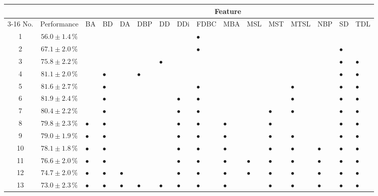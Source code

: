 \documentclass[11pt]{article}
\newcommand{\Sumbul}{S\"{u}mb\"{u}l\xspace}
\begin{document}
\begin{sidewaystable}
\begin{tabular}{ccllllllllllllll}
\toprule
 & & \multicolumn{14}{c}{Feature}\\
\cline{3-16}
No. & Performance  & BA & BD & DA & DBP & DD & DDi & FDBC & MBA & MSL & MST & MTSL & NBP & SD & TDL\\
\midrule
1 & $56.0 \pm 1.4\,\%$  &  &  &  &  &  &  & $\bullet$ &  &  &  &  &  &  & \\
2 & $67.1 \pm 2.0\,\%$  &  &  &  &  &  &  & $\bullet$ &  &  &  &  &  & $\bullet$ & \\
3 & $75.8 \pm 2.2\,\%$  &  &  &  &  & $\bullet$ &  &  &  &  &  &  &  & $\bullet$ & $\bullet$\\
4 & $81.1 \pm 2.0\,\%$  &  & $\bullet$ &  & $\bullet$ &  &  &  &  &  &  &  &  & $\bullet$ & $\bullet$\\
5 & $81.6 \pm 2.7\,\%$  &  & $\bullet$ &  &  &  &  & $\bullet$ &  &  &  & $\bullet$ &  & $\bullet$ & $\bullet$\\
6 & $81.9 \pm 2.4\,\%$  &  & $\bullet$ &  &  &  & $\bullet$ & $\bullet$ &  &  &  & $\bullet$ &  & $\bullet$ & $\bullet$\\
7 & $80.4 \pm 2.2\,\%$  &  & $\bullet$ &  &  &  & $\bullet$ & $\bullet$ &  &  & $\bullet$ & $\bullet$ &  & $\bullet$ & $\bullet$\\
8 & $79.8 \pm 2.3\,\%$  & $\bullet$ & $\bullet$ &  &  &  & $\bullet$ & $\bullet$ & $\bullet$ &  & $\bullet$ &  &  & $\bullet$ & $\bullet$\\
9 & $79.0 \pm 1.9\,\%$  & $\bullet$ & $\bullet$ &  &  &  & $\bullet$ & $\bullet$ & $\bullet$ &  & $\bullet$ & $\bullet$ &  & $\bullet$ & $\bullet$\\
10 & $78.1 \pm 1.8\,\%$  & $\bullet$ & $\bullet$ &  &  &  & $\bullet$ & $\bullet$ & $\bullet$ &  & $\bullet$ & $\bullet$ & $\bullet$ & $\bullet$ & $\bullet$\\
11 & $76.6 \pm 2.0\,\%$  & $\bullet$ & $\bullet$ &  &  &  & $\bullet$ & $\bullet$ & $\bullet$ & $\bullet$ & $\bullet$ & $\bullet$ & $\bullet$ & $\bullet$ & $\bullet$\\
12 & $74.7 \pm 2.0\,\%$  & $\bullet$ & $\bullet$ & $\bullet$ &  &  & $\bullet$ & $\bullet$ & $\bullet$ & $\bullet$ & $\bullet$ & $\bullet$ & $\bullet$ & $\bullet$ & $\bullet$\\
13 & $73.0 \pm 2.3\,\%$  & $\bullet$ & $\bullet$ & $\bullet$ & $\bullet$ & $\bullet$ & $\bullet$ & $\bullet$ & $\bullet$ &  & $\bullet$ & $\bullet$ & $\bullet$ & $\bullet$ & $\bullet$\\
\bottomrule
\end{tabular}
\caption{Feature set performance for \Sumbul dataset. See Table
  \ref{tab:performance} for abbreviations.}
\label{tab:sumbulfeatureselection}
\end{sidewaystable}
\end{document}
